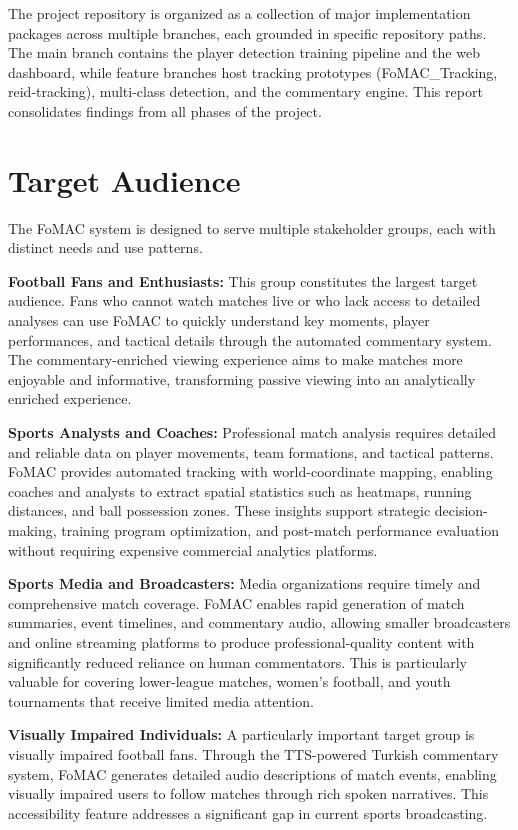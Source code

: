 \documentclass[10pt,twocolumn,a4paper]{article}
\begin{document}
The project repository is organized as a collection of major implementation packages across multiple branches, each grounded in specific repository paths. The main branch contains the player detection training pipeline and the web dashboard, while feature branches host tracking prototypes (FoMAC\_Tracking, reid-tracking), multi-class detection, and the commentary engine. This report consolidates findings from all phases of the project.

\section{Target Audience}

The FoMAC system is designed to serve multiple stakeholder groups, each with distinct needs and use patterns.

\textbf{Football Fans and Enthusiasts:} This group constitutes the largest target audience. Fans who cannot watch matches live or who lack access to detailed analyses can use FoMAC to quickly understand key moments, player performances, and tactical details through the automated commentary system. The commentary-enriched viewing experience aims to make matches more enjoyable and informative, transforming passive viewing into an analytically enriched experience.

\textbf{Sports Analysts and Coaches:} Professional match analysis requires detailed and reliable data on player movements, team formations, and tactical patterns. FoMAC provides automated tracking with world-coordinate mapping, enabling coaches and analysts to extract spatial statistics such as heatmaps, running distances, and ball possession zones. These insights support strategic decision-making, training program optimization, and post-match performance evaluation without requiring expensive commercial analytics platforms.

\textbf{Sports Media and Broadcasters:} Media organizations require timely and comprehensive match coverage. FoMAC enables rapid generation of match summaries, event timelines, and commentary audio, allowing smaller broadcasters and online streaming platforms to produce professional-quality content with significantly reduced reliance on human commentators. This is particularly valuable for covering lower-league matches, women's football, and youth tournaments that receive limited media attention.

\textbf{Visually Impaired Individuals:} A particularly important target group is visually impaired football fans. Through the TTS-powered Turkish commentary system, FoMAC generates detailed audio descriptions of match events, enabling visually impaired users to follow matches through rich spoken narratives. This accessibility feature addresses a significant gap in current sports broadcasting.
\end{document}
